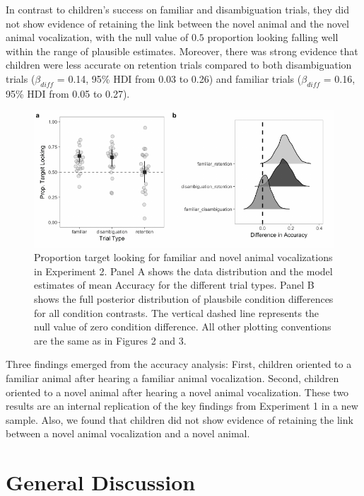 \documentclass[english,floatsintext,man]{apa6}
\theoremstyle{definition}
\theoremstyle{definition}
\theoremstyle{definition}
\theoremstyle{remark}
\begin{document}
In contrast to children's success on familiar and disambiguation trials,
they did not show evidence of retaining the link between the novel
animal and the novel animal vocalization, with the null value of \(0.5\)
proportion looking falling well within the range of plausible estimates.
Moreover, there was strong evidence that children were less accurate on
retention trials compared to both disambiguation trials
(\(\beta_{diff}\) = 0.14, 95\% HDI from 0.03 to 0.26) and familiar
trials (\(\beta_{diff}\) = 0.16, 95\% HDI from 0.05 to 0.27).

\begin{figure}[t]

{\centering \includegraphics[width=0.85\linewidth]{anime_manuscript_files/figure-latex/acc-plot-e2-1} 

}

\caption{Proportion target looking for  familiar and novel animal vocalizations in Experiment 2. Panel A shows the data distribution and the model estimates of mean Accuracy for the different trial types. Panel B shows the full posterior distribution of plausbile condition differences for all condition contrasts. The vertical dashed line represents the null value of zero condition difference. All other plotting conventions are the same as in Figures 2 and 3.}\label{fig:acc-plot-e2}
\end{figure}

Three findings emerged from the accuracy analysis: First, children
oriented to a familiar animal after hearing a familiar animal
vocalization. Second, children oriented to a novel animal after hearing
a novel animal vocalization. These two results are an internal
replication of the key findings from Experiment 1 in a new sample. Also,
we found that children did not show evidence of retaining the link
between a novel animal vocalization and a novel animal.

\hypertarget{general-discussion}{%
\section{General Discussion}\label{general-discussion}}
\end{document}
